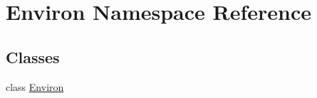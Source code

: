 \hypertarget{namespace_environ}{\section{Environ Namespace Reference}
\label{namespace_environ}
}
\subsection*{Classes}
\begin{DoxyCompactItemize}
\item 
class \hyperlink{class_environ_1_1_environ}{Environ}
\end{DoxyCompactItemize}
